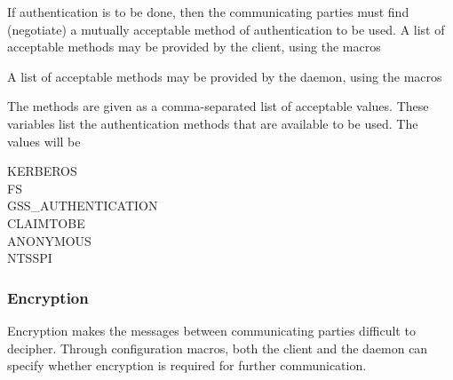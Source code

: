 If authentication is to be done, then the communicating parties
must find (negotiate) a mutually acceptable method of
authentication to be used.
A list of acceptable methods may be provided by the client, using the
macros
\begin{description}
\item{}
\item{}
\end{description}
A list of acceptable methods may be provided by the daemon, using the
macros
\begin{description}
\item{}
\item{}
\item{}
\item{}
\item{}
\item{}
\item{}
\item{}
\end{description}
The methods are
given as a comma-separated list of acceptable values.
These variables list the authentication methods that are available
to be used.
The values will be 
\begin{description}
    \item[KERBEROS]
    \item[FS]
    \item[GSS\_AUTHENTICATION]
    \item[CLAIMTOBE]
    \item[ANONYMOUS]
    \item[NTSSPI]
\end{description}

\subsubsection{\label{sec:Security-Encryption} Encryption}
Encryption makes the messages between communicating parties
difficult to decipher.
Through configuration macros, both the client and the daemon
can specify whether encryption is required for further communication.

